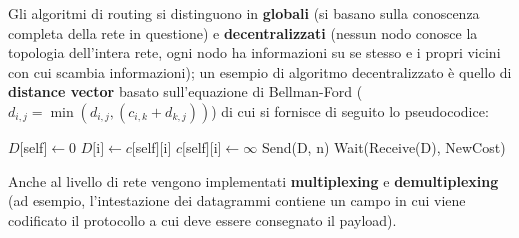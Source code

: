 \documentclass[11pt, italian, openany]{book}
\begin{document}
\begin{sloppypar}
Gli algoritmi di routing si distinguono in \textbf{globali} (si basano sulla conoscenza completa della rete in questione) e \textbf{decentralizzati} (nessun
nodo conosce la topologia dell'intera rete, ogni nodo ha informazioni su se stesso e i propri vicini con cui scambia informazioni); un esempio di algoritmo
decentralizzato \`e quello di \textbf{distance vector} basato sull'equazione di Bellman-Ford (\( d_{i,j} = \min(d_{i,j}, (c_{i,k} + d_{k,j})) \)) di cui
si fornisce di seguito lo pseudocodice:

\begin{algorithmic}
		\State $D[$self$] \gets 0$
				\State $ D[$i$] \gets c[$self$][$i$] $
			\Else
				\State $ c[$self$][$i$] \gets \infty $
			\EndIf
		\EndFor
			\State Send(D, n)
		\EndFor
			\State Wait(Receive(D), NewCost)
			\EndFor
		\EndWhile
	\EndFunction
\end{algorithmic}


Anche al livello di rete vengono implementati \textbf{multiplexing} e \textbf{demultiplexing} (ad esempio, l'intestazione dei datagrammi contiene un campo
in cui viene codificato il protocollo a cui deve essere consegnato il payload).


\end{sloppypar}
\end{document}
